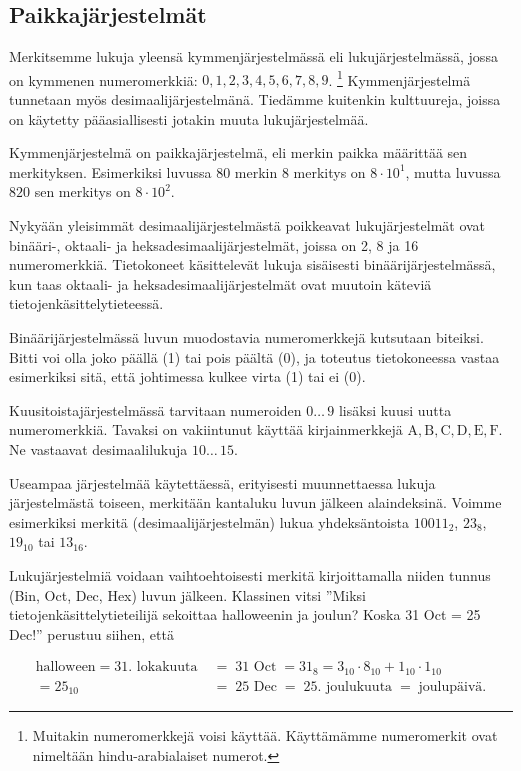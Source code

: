 \subsection*{Paikkajärjestelmät}

Merkitsemme lukuja yleensä kymmenjärjestelmässä eli lukujärjestelmässä, jossa on kymmenen numeromerkkiä: $0, 1, 2, 3, 4, 5, 6, 7, 8, 9$.
\footnote{Muitakin numeromerkkejä voisi käyttää. Käyttämämme numeromerkit ovat nimeltään hindu-arabialaiset numerot.}
Kymmenjärjestelmä tunnetaan myös desimaalijärjestelmänä. Tiedämme kuitenkin kulttuureja, joissa on käytetty pääasiallisesti jotakin muuta lukujärjestelmää.

Kymmenjärjestelmä on paikkajärjestelmä, eli merkin paikka määrittää sen merkityksen. Esimerkiksi luvussa $80$ merkin 8 merkitys on $8 \cdot 10^1$, mutta luvussa
$820$ sen merkitys on $8 \cdot 10^2$.

Nykyään yleisimmät desimaalijärjestelmästä poikkeavat lukujärjestelmät ovat binääri-, oktaali- ja heksadesimaalijärjestelmät, joissa on 2, 8 ja 16 numeromerkkiä.
Tietokoneet käsittelevät lukuja sisäisesti binäärijärjestelmässä, kun taas oktaali- ja heksadesimaalijärjestelmät ovat muutoin käteviä tietojenkäsittelytieteessä.

Binäärijärjestelmässä luvun muodostavia numeromerkkejä kutsutaan biteiksi.
Bitti voi olla joko päällä (1) tai pois päältä (0), ja toteutus tietokoneessa vastaa esimerkiksi sitä, että johtimessa kulkee virta (1) tai ei (0).

Kuusitoistajärjestelmässä tarvitaan numeroiden $0 \ldots \, 9$ lisäksi kuusi uutta numeromerkkiä.
Tavaksi on vakiintunut käyttää kirjainmerkkejä $\mathrm{A, B, C, D, E, F}$. Ne vastaavat desimaalilukuja $10 \ldots \, 15$.

Useampaa järjestelmää käytettäessä, erityisesti muunnettaessa lukuja järjestelmästä toiseen, merkitään kantaluku luvun jälkeen alaindeksinä.
Voimme esimerkiksi merkitä (desimaalijärjestelmän) lukua yhdeksäntoista $10011_{2}$, $23_{8}$, $19_{10}$ tai $13_{16}$.

Lukujärjestelmiä voidaan vaihtoehtoisesti merkitä kirjoittamalla niiden tunnus (Bin, Oct, Dec, Hex) luvun jälkeen.
Klassinen vitsi ''Miksi tietojenkäsittelytieteilijä sekoittaa halloweenin ja joulun? Koska 31 Oct = 25 Dec!'' perustuu siihen, että

\begin{align*}
	\text{halloween} \; = \; \text{31. lokakuuta} \; &= \; \text{31 Oct} \; = 31_8 = 3_{10} \cdot 8_{10} + 1_{10} \cdot 1_{10} \\
	= {25}_{10} &= \; \text{25 Dec} \; = \; \text{25. joulukuuta} \; = \; \text{joulupäivä.}
\end{align*}

